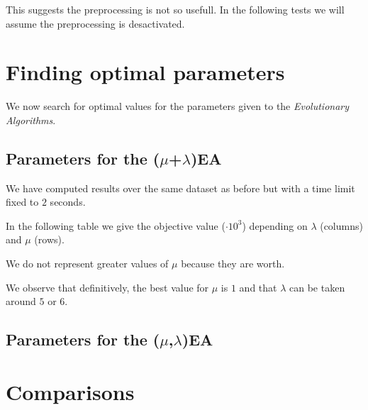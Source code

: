 \documentclass[a4paper]{article}
\begin{document}
This suggests the preprocessing is not so usefull. In the following tests we will assume the preprocessing is desactivated.

\section{Finding optimal parameters}

We now search for optimal values for the parameters given to the \textit{Evolutionary Algorithms}.

\subsection{Parameters for the ($\mu$+$\lambda$)EA}

We have computed results over the same dataset as before but with a time limit fixed to $2$ seconds.

In the following table we give the objective value ($\cdot 10^3$) depending on $\lambda$ (columns) and $\mu$ (rows). 


We do not represent greater values of $\mu$ because they are worth.

We observe that definitively, the best value for $\mu$ is $1$ and that $\lambda$ can be taken around $5$ or $6$.


\subsection{Parameters for the ($\mu$,$\lambda$)EA}

\section{Comparisons}
\end{document}
